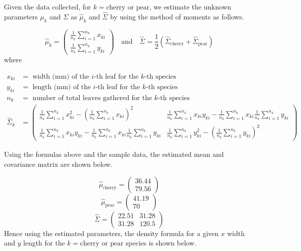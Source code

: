 \documentclass[]{article}
\begin{document}
Given the data collected, for \(k = \text{cherry or pear}\), we estimate
the unknown parameters \(\mu_k\) and \(\Sigma\) as \(\hat{\mu}_k\) and
\(\hat{\Sigma}\) by using the method of moments as follows.

\[ \hat{\mu}_k =
\left(
\begin{matrix}
\frac{1}{n_k}\sum_{i=1}^{n_k} x_{ki} \\
\frac{1}{n_k}\sum_{i=1}^{n_k} y_{ki}
\end{matrix}
\right) \quad \text{and} \quad 
\hat{\Sigma} = \frac{1}{2} \left(\hat{\Sigma}_{\text{cherry}} + \hat{\Sigma}_{\text{pear}} \right)\]
where

\begin{align*}
x_{ki} &= \text{ width (mm) of the $i$-th leaf for the $k$-th species} \\
y_{ki} &= \text{ length (mm) of the $i$-th leaf for the $k$-th species} \\
n_{k} &= \text{ number of total leaves gathered for the $k$-th species} \\
\hat{\Sigma}_k &=
\left(\begin{matrix}
\frac{1}{n_k}\sum_{i=1}^{n_k} x_{ki}^2 - \left(\frac{1}{n_k}\sum_{i=1}^{n_k} x_{ki} \right) ^2
&\frac{1}{n_k}\sum_{i=1}^{n_k} x_{ki} y_{ki} - \frac{1}{n_k}\sum_{i=1}^{n_k} x_{ki} \frac{1}{n_k}\sum_{i=1}^{n_k} y_{ki}
\\
\frac{1}{n_k}\sum_{i=1}^{n_k} x_{ki} y_{ki} - \frac{1}{n_k}\sum_{i=1}^{n_k} x_{ki} \frac{1}{n_k}\sum_{i=1}^{n_k} y_{ki}
&\frac{1}{n_k}\sum_{i=1}^{n_k} y_{ki}^2 - \left(\frac{1}{n_k}\sum_{i=1}^{n_k} y_{ki} \right) ^2
\end{matrix}\right)
\end{align*}

Using the formulas above and the sample data, the estimated mean and
covariance matrix are shown below.

\[\hat{\mu}_{\text{cherry}} = \left(\begin{matrix} 36.44  \\ 79.56 \end{matrix} \right)\]
\[\hat{\mu}_{\text{pear}} = \left(\begin{matrix} 41.19  \\ 70 \end{matrix} \right)\]
\[\hat{\Sigma} = \left( \begin{matrix}22.51 &31.28 \\ 31.28  & 120.5\end{matrix}\right) \]
Hence using the estimated parameters, the density formula for a given
\(x\) width and \(y\) length for the \(k=\text{cherry or pear}\) species
is shown below.
\end{document}
